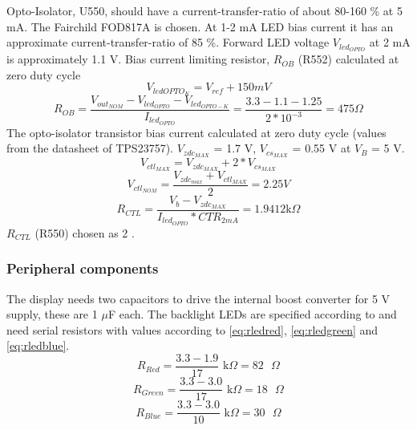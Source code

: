 Opto-Isolator, U550, should have a current-transfer-ratio of about
80-160 \% at 5 mA. The Fairchild FOD817A is chosen. At 1-2 mA LED bias
current it has an approximate current-transfer-ratio of 85 \%. Forward
LED voltage $V_{led_{OPTO}}$ at 2 mA is approximately 1.1 V. Bias
current limiting resistor, $R_{OB}$ (R552) calculated at zero duty
cycle
\begin{equation}
V_{led{OPTO_K}} = V_{ref} + 150 mV
\end{equation}
\begin{equation}
R_{OB} = \frac{V_{out_{NOM}} - V_{led_{OPTO}} -
V_{led_{OPTO-K}}}{I_{led_{OPTO}}} = \frac{3.3 - 1.1 - 1.25}{2*10^{-3}}
= 475 \Omega
\end{equation}
The opto-isolator transistor bias current calculated at zero duty
cycle (values from the datasheet of TPS23757). $V_{zdc_{MAX}}$ = 1.7
V, $V_{cs_{MAX}}$ = 0.55 V at $V_B$ = 5 V.
\begin{equation}
V_{ctl_{MAX}} = V_{zdc_{MAX}} + 2*V_{cs_{MAX}}
\end{equation}
\begin{equation}
V_{ctl_{NOM}} = \frac{V_{zdc_{max}} + V_{ctl_{MAX}}}{2} = 2.25 V
\end{equation}
\begin{equation}
R_{CTL} = \frac{V_b - V_{zdc_{MAX}}}{I_{led_{OPTO}}*CTR_{2mA}} =
1.9412 \text{k$\Omega$}
\end{equation}
$R_{CTL}$ (R550) chosen as 2 .



\subsubsection{Peripheral components}
The display needs two capacitors to drive the internal boost converter
for 5 V supply, these are 1 $\mu$F each. The backlight LEDs are
specified according to  and need serial
resistors with values according to \ref{eq:rledred}, \ref{eq:rledgreen}
and \ref{eq:rledblue}.
\begin{equation}
R_{Red} = \frac{3.3 - 1.9}{17} \text{ k$\Omega$} = 82 \text{ $\Omega$}
\label{eq:rledred}
\end{equation}
\begin{equation}
R_{Green} = \frac{3.3 - 3.0}{17} \text{ k$\Omega$} = 18 \text{ $\Omega$}
\label{eq:rledgreen}
\end{equation}
\begin{equation}
R_{Blue} = \frac{3.3 - 3.0}{10} \text{ k$\Omega$} = 30 \text{ $\Omega$}
\label{eq:rledblue}
\end{equation}

